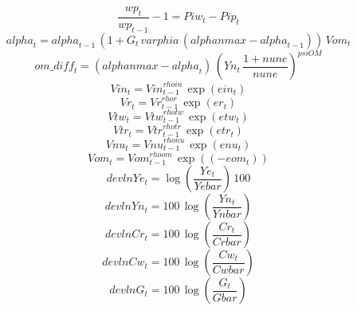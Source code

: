 \begin{dmath}
\frac{{wp}_{t}}{{wp}_{t-1}}-1={Piw}_{t}-{Pip}_{t}
\end{dmath}
\begin{dmath}
{alpha}_{t}={alpha}_{t-1}\, \left(1+{G}_{t}\, {varphia}\, \left({alphanmax}-{alpha}_{t-1}\right)\right)\, {Vom}_{t}
\end{dmath}
\begin{dmath}
{om\_diff}_{t}=\left({alphanmax}-{alpha}_{t}\right)\, \left({Yn}_{t}\, \frac{1+{nune}}{{nune}}\right)^{{psiOM}}
\end{dmath}
\begin{dmath}
{Vin}_{t}={Vin}_{t-1}^{{rhoin}}\, \exp\left({ein}_{t}\right)
\end{dmath}
\begin{dmath}
{Vr}_{t}={Vr}_{t-1}^{{rhor}}\, \exp\left({er}_{t}\right)
\end{dmath}
\begin{dmath}
{Vtw}_{t}={Vtw}_{t-1}^{{rhotw}}\, \exp\left({etw}_{t}\right)
\end{dmath}
\begin{dmath}
{Vtr}_{t}={Vtr}_{t-1}^{{rhotr}}\, \exp\left({etr}_{t}\right)
\end{dmath}
\begin{dmath}
{Vnu}_{t}={Vnu}_{t-1}^{{rhonu}}\, \exp\left({enu}_{t}\right)
\end{dmath}
\begin{dmath}
{Vom}_{t}={Vom}_{t-1}^{{rhoom}}\, \exp\left(\left(-{eom}_{t}\right)\right)
\end{dmath}
\begin{dmath}
{devlnYe}_{t}=\log\left(\frac{{Ye}_{t}}{{Yebar}}\right)\, 100
\end{dmath}
\begin{dmath}
{devlnYn}_{t}=100\, \log\left(\frac{{Yn}_{t}}{{Ynbar}}\right)
\end{dmath}
\begin{dmath}
{devlnCr}_{t}=100\, \log\left(\frac{{Cr}_{t}}{{Crbar}}\right)
\end{dmath}
\begin{dmath}
{devlnCw}_{t}=100\, \log\left(\frac{{Cw}_{t}}{{Cwbar}}\right)
\end{dmath}
\begin{dmath}
{devlnG}_{t}=100\, \log\left(\frac{{G}_{t}}{{Gbar}}\right)
\end{dmath}
